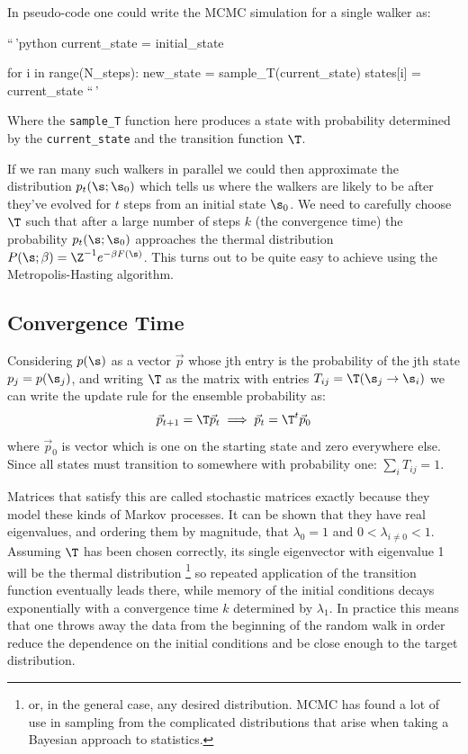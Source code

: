 In pseudo-code one could write the MCMC simulation for a single walker as:

``\,'python current\_state = initial\_state

for i in range(N\_steps): new\_state = sample\_T(current\_state) states{[}i{]} = current\_state ``\,'

Where the \texttt{sample\_T} function here produces a state with probability determined by the \texttt{current\_state} and the transition function \(\T\).

If we ran many such walkers in parallel we could then approximate the distribution \(p_t(\s; \s_0)\) which tells us where the walkers are likely to be after they've evolved for \(t\) steps from an initial state \(\s_0\). We need to carefully choose \(\T\) such that after a large number of steps \(k\) (the convergence time) the probability \(p_t(\s;\s_0)\) approaches the thermal distribution \(P(\s; \beta) = \Z^{-1} e^{-\beta F(\s)}\). This turns out to be quite easy to achieve using the Metropolis-Hasting algorithm.

\hypertarget{convergence-time-1}{%
\subsection{Convergence Time}\label{convergence-time-1}}

Considering \(p(\s)\) as a vector \(\vec{p}\) whose jth entry is the probability of the jth state \(p_j = p(\s_j)\), and writing \(\T\) as the matrix with entries \(T_{ij} = \T(\s_j \rightarrow \s_i)\) we can write the update rule for the ensemble probability as: \[\vec{p}_{t+1} = \T \vec{p}_t \implies \vec{p}_{t} = \T^t \vec{p}_0\] where \(\vec{p}_0\) is vector which is one on the starting state and zero everywhere else. Since all states must transition to somewhere with probability one: \(\sum_i T_{ij} = 1\).

Matrices that satisfy this are called stochastic matrices exactly because they model these kinds of Markov processes. It can be shown that they have real eigenvalues, and ordering them by magnitude, that \(\lambda_0 = 1\) and \(0 < \lambda_{i\neq0} < 1\). Assuming \(\T\) has been chosen correctly, its single eigenvector with eigenvalue 1 will be the thermal distribution \footnote{or, in the general case, any desired distribution. MCMC has found a lot of use in sampling from the complicated distributions that arise when taking a Bayesian approach to statistics.} so repeated application of the transition function eventually leads there, while memory of the initial conditions decays exponentially with a convergence time \(k\) determined by \(\lambda_1\). In practice this means that one throws away the data from the beginning of the random walk in order reduce the dependence on the initial conditions and be close enough to the target distribution.

